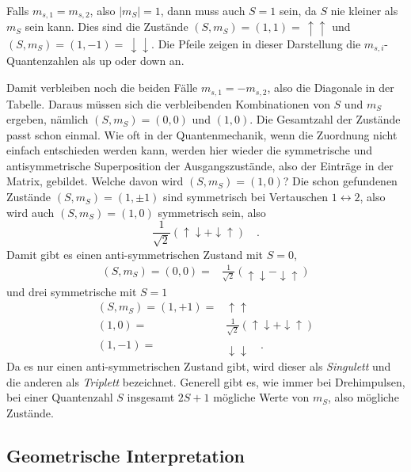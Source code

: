 Falls $m_{s,1} = m_{s,2}$, also $|m_S| = 1$, dann muss auch $S = 1$ sein, da $S$ nie kleiner als $m_S$ sein kann. Dies sind die Zustände  $(S, m_S) = (1,1) = \, \uparrow\uparrow$ und  $(S, m_S) = (1,-1) = \,  \downarrow\downarrow$. Die Pfeile zeigen in dieser Darstellung die  $m_{s,i}$-Quantenzahlen als up oder down an.

Damit verbleiben noch die beiden Fälle $m_{s,1} = - m_{s,2}$, also die Diagonale in der Tabelle. Daraus müssen sich die verbleibenden Kombinationen von $S$ und $m_S$ ergeben, nämlich $(S, m_S) = (0,0)$ und $(1,0)$. Die Gesamtzahl der Zustände passt schon einmal. Wie oft in der Quantenmechanik, wenn die Zuordnung nicht einfach entschieden werden kann, werden hier wieder die symmetrische und antisymmetrische Superposition der Ausgangszustände, also der Einträge in der Matrix, gebildet. Welche davon wird  $(S, m_S) = (1,0)$? Die schon gefundenen Zustände $(S, m_S) = (1,\pm1) $ sind symmetrisch bei Vertauschen $1 \leftrightarrow 2$, also wird auch $(S, m_S) = (1,0)$ symmetrisch sein, also 
\begin{equation}
   \frac{1}{\sqrt{2}} \left(  \uparrow \downarrow  +  \downarrow \uparrow \right) \quad .
\end{equation}
Damit gibt es einen anti-symmetrischen Zustand mit $S = 0$, 
\begin{align}
    (S, m_S) = (0, 0)  = & \frac{1}{\sqrt{2}} \left(  \uparrow \downarrow -  \downarrow \uparrow \right) 
\end{align}
und drei symmetrische mit $S=1$
\begin{align}
    (S, m_S) =  (1, +1) =& \uparrow \uparrow  \\
  (1, 0) = & \frac{1}{\sqrt{2}} \left( \uparrow \downarrow +  \downarrow \uparrow \right) \\
  (1, -1) = &\downarrow \downarrow   \quad .
\end{align}
Da es nur einen anti-symmetrischen Zustand gibt, wird dieser als \emph{Singulett} und die anderen als \emph{Triplett} bezeichnet. Generell gibt es, wie immer bei Drehimpulsen, bei einer Quantenzahl $S$ insgesamt $2S+1$ mögliche Werte von $m_S$, also mögliche Zustände.

\subsection{Geometrische Interpretation}

